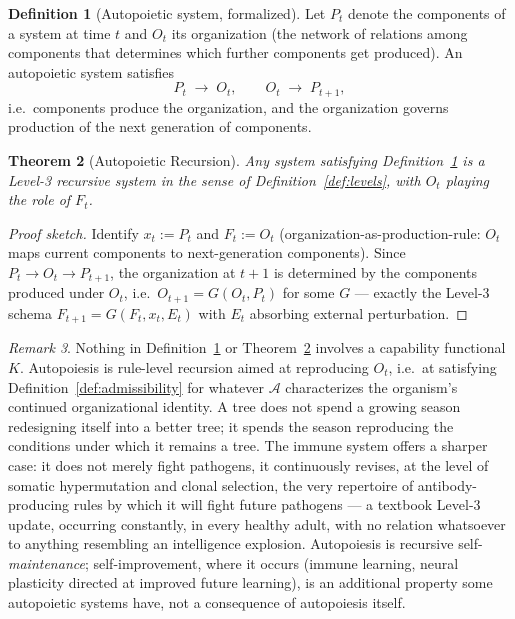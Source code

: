 \documentclass[11pt,a4paper]{article}
\theoremstyle{plain}
\newtheorem{theorem}{Theorem}[section]
\theoremstyle{definition}
\newtheorem{definition}[theorem]{Definition}
\theoremstyle{remark}
\newtheorem{remark}[theorem]{Remark}
\newcommand{\Adm}{\mathcal{A}}
\begin{document}
\begin{definition}[Autopoietic system, formalized]
\label{def:autopoiesis}
Let $P_t$ denote the components of a system at time $t$ and $O_t$ its organization (the network of relations among components that determines which further components get produced). An autopoietic system satisfies
\[
P_t \;\longrightarrow\; O_t, \qquad O_t \;\longrightarrow\; P_{t+1},
\]
i.e.\ components produce the organization, and the organization governs production of the next generation of components.
\end{definition}

\begin{theorem}[Autopoietic Recursion]
\label{thm:autopoietic-recursion}
Any system satisfying Definition~\ref{def:autopoiesis} is a Level-3 recursive system in the sense of Definition~\ref{def:levels}, with $O_t$ playing the role of $F_t$.
\end{theorem}

\begin{proof}[Proof sketch]
Identify $x_t := P_t$ and $F_t := O_t$ (organization-as-production-rule: $O_t$ maps current components to next-generation components). Since $P_t \to O_t \to P_{t+1}$, the organization at $t+1$ is determined by the components produced under $O_t$, i.e.\ $O_{t+1} = G(O_t, P_t)$ for some $G$ — exactly the Level-3 schema $F_{t+1}=G(F_t,x_t,E_t)$ with $E_t$ absorbing external perturbation.
\end{proof}

\begin{remark}
Nothing in Definition~\ref{def:autopoiesis} or Theorem~\ref{thm:autopoietic-recursion} involves a capability functional $K$. Autopoiesis is rule-level recursion aimed at reproducing $O_t$, i.e.\ at satisfying Definition~\ref{def:admissibility} for whatever $\Adm$ characterizes the organism's continued organizational identity. A tree does not spend a growing season redesigning itself into a better tree; it spends the season reproducing the conditions under which it remains a tree. The immune system offers a sharper case: it does not merely fight pathogens, it continuously revises, at the level of somatic hypermutation and clonal selection, the very repertoire of antibody-producing rules by which it will fight future pathogens — a textbook Level-3 update, occurring constantly, in every healthy adult, with no relation whatsoever to anything resembling an intelligence explosion. Autopoiesis is recursive self-\emph{maintenance}; self-improvement, where it occurs (immune learning, neural plasticity directed at improved future learning), is an additional property some autopoietic systems have, not a consequence of autopoiesis itself.
\end{remark}
\end{document}
